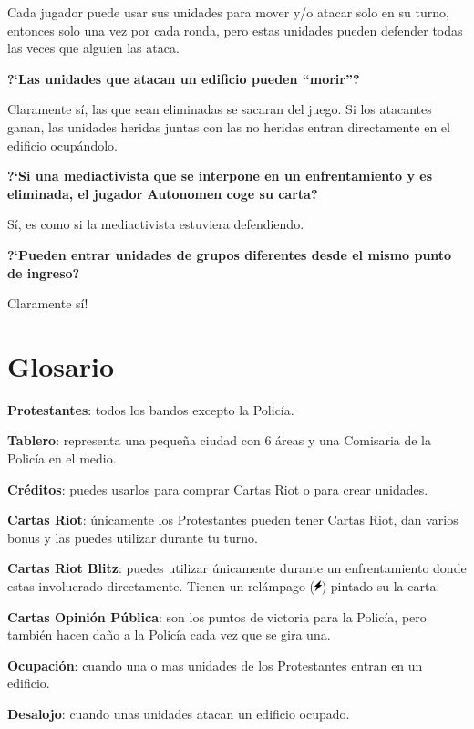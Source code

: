 \documentclass[a4paper,13pt]{scrartcl}
\begin{document}
Cada jugador puede usar sus unidades para mover y/o atacar solo en su turno, entonces solo una vez por cada ronda, pero
estas unidades pueden defender todas las veces que alguien las ataca.
\bigskip

{\bfseries
?`Las unidades que atacan un edificio pueden ``morir''?} \nopagebreak

Claramente s\'i, las que sean eliminadas se sacaran del juego. Si los atacantes ganan, las unidades heridas juntas con
las no heridas entran directamente en el edificio ocup\'andolo.
\bigskip

{\bfseries
?`Si una mediactivista que se interpone en un enfrentamiento y es eliminada, el jugador Autonomen coge su carta?} \nopagebreak

S\'i, es como si la mediactivista estuviera defendiendo.
\bigskip

{\bfseries
?`Pueden entrar unidades de grupos diferentes desde el mismo punto de ingreso?} \nopagebreak

Claramente s\'i!

\section*{Glosario}
\textbf{Protestantes}:\textbf{ }todos los bandos excepto la Polic\'ia.

\textbf{Tablero}: representa una peque\~na ciudad con 6 \'areas y una Comisaria de la Polic\'ia en el medio.

\textbf{Cr\'editos}: puedes usarlos para comprar Cartas Riot o para crear unidades.

\textbf{Cartas Riot}: \'unicamente los Protestantes pueden tener Cartas Riot, dan varios bonus y las puedes utilizar
durante tu turno.

\textbf{Cartas Riot Blitz}: puedes utilizar \'unicamente durante un enfrentamiento donde estas involucrado directamente.
Tienen un rel\'ampago (\includegraphics[height=9pt]{blitz.png}) pintado su la carta.

\textbf{Cartas Opini\'on P\'ublica}: son los puntos de victoria para la Polic\'ia, pero tambi\'en hacen da\~no a la
Polic\'ia cada vez que se gira una.

\textbf{Ocupaci\'on}: cuando una o mas unidades de los Protestantes entran en un edificio.

\textbf{Desalojo}: cuando unas unidades atacan un edificio ocupado.
\end{document}
